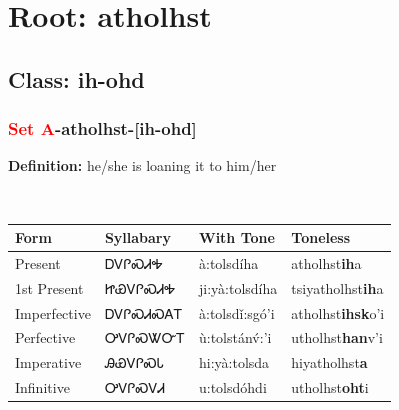 \needspace{4in}
\section*{Root: atholhst}
\nopagebreak
{}
\needspace{3in}
\subsection*{Class: ih-ohd}
\nopagebreak
\needspace{2in}
\subsubsection*{\textcolor{Red}{Set A}{-}\textbf{atholhst}{-}[ih-ohd]}
\nopagebreak
\textbf{Definition: } he/she is loaning it to him/her
\\[0.5em]
\begin{tabularx}{\textwidth}{l X X X}%
\toprule%
\textbf{Form}&\textbf{Syllabary}&\textbf{With Tone}&\textbf{Toneless}\\%
\midrule%
Present&ᎠᏙᎵᏍᏗᎭ&à:tolsdíha&atholhst\textbf{ih}a\\%
1st Present&ᏥᏯᏙᎵᏍᏗᎭ&ji:yà:tolsdíha&tsiyatholhst\textbf{ih}a\\%
Imperfective&ᎠᏙᎵᏍᏗᏍᎪᎢ&à:tolsdǐ:sgó’i&atholhst\textbf{ihsk}o'i\\%
Perfective&ᎤᏙᎵᏍᏔᏅᎢ&ù:tolstánv́:’i&utholhst\textbf{han}v'i\\%
Imperative&ᎯᏯᏙᎵᏍᏓ&hi:yà:tolsda&hiyatholhst\textbf{a}\\%
Infinitive&ᎤᏙᎵᏍᏙᏗ&u:tolsdóhdi&utholhst\textbf{oht}i\\%
\bottomrule%
\end{tabularx}
\\[1em]